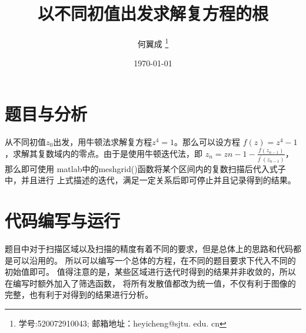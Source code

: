 \documentclass[UTF8,a4paper,10pt]{ctexart}
\title{\textbf{以不同初值出发求解复方程的根}}
\author{ 何翼成 \thanks{学号:520072910043; \newline
    邮箱地址：heyicheng@sjtu. edu. cn} }
\date{\today}
\begin{document}
\maketitle


\section{题目与分析}
从不同初值$z_{0}$出发，用牛顿法求解复方程$z^{4}=1$。那么可以设方程
$f(z)=z^{4}-1$，求解其复数域内的零点。由于是使用牛顿迭代法，即
$z_{n}=z{n-1}-\frac{f(z_{n-1})}{f^{'}(z_{n-1})}$，那么即可使用
matlab中的meshgrid()函数将某个区间内的复数扫描后代入式子中，并且进行
上式描述的迭代，满足一定关系后即可停止并且记录得到的结果。

\section{代码编写与运行}
题目中对于扫描区域以及扫描的精度有着不同的要求，但是总体上的思路和代码都是可以沿用的。
所以可以编写一个总体的方程，在不同的题目要求下代入不同的初始值即可。\newline
值得注意的是，某些区域进行迭代时得到的结果并非收敛的，所以在编写时额外加入了筛选函数，
将所有发散值都改为统一值，不仅有利于图像的完整，也有利于对得到的结果进行分析。\newline
\end{document}

